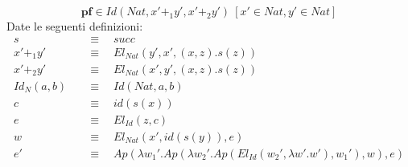 \begin{displaymath}
    \textbf{pf} \in Id(Nat, x' +_1 y', x' +_2 y')\ [x' \in Nat, y' \in Nat]
\end{displaymath}
Date le seguenti definizioni:
\begin{align*}
    s\quad&\equiv\quad succ\\
    x' +_1 y' \quad&\equiv\quad El_{Nat} (y', x', (x, z).s(z))\\
    x' +_2 y' \quad&\equiv\quad El_{Nat} (x', y', (x, z).s(z))\\
    Id_N(a, b) \quad&\equiv\quad Id(Nat, a, b)\\
    c \quad&\equiv\quad id(s(x)) \\
    e \quad&\equiv\quad El_{Id}(z, c) \\
    w \quad&\equiv\quad El_{Nat} (x', id(s(y)), e) \\
    e' \quad&\equiv\quad Ap(\lambda w_1'. Ap(\lambda w_2'. Ap(El_{Id}(w_2', \lambda w'.w'), w_1'),w), e)
\end{align*}
